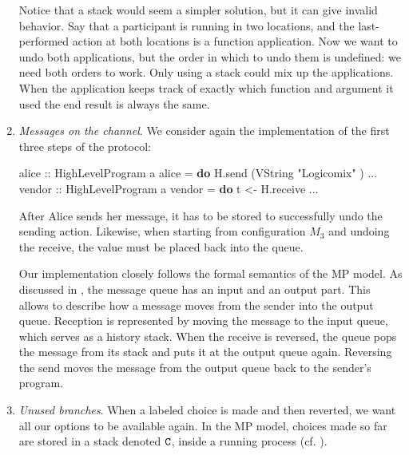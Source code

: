 \documentclass[runningheads,plain]{llncs}
\newcommand{\checkthis}[1]{#1}
\newenvironment{Shaded}{}{}
\newcommand{\KeywordTok}[1]{\textcolor[rgb]{0.00,0.44,0.13}{\textbf{#1}}}
\newcommand{\DataTypeTok}[1]{\textcolor[rgb]{0.56,0.13,0.00}{#1}}
\newcommand{\StringTok}[1]{\textcolor[rgb]{0.25,0.44,0.63}{#1}}
\newcommand{\OtherTok}[1]{\textcolor[rgb]{0.00,0.44,0.13}{#1}}
\newcommand{\FunctionTok}[1]{\textcolor[rgb]{0.02,0.16,0.49}{#1}}
\newcommand{\NormalTok}[1]{#1}
\begin{document}
\begin{enumerate}[1.]
 Notice that a stack would seem a simpler solution, but it
  can give invalid behavior. Say that a participant is running in two
  locations, and the last-performed action at both locations is a
  function application. Now we want to undo both applications, but the
  order in which to undo them is undefined: we need both orders to work.
  Only using a stack could mix up the applications. When the application
  keeps track of exactly which function and argument it used the end
  result is always the same.  \\
  
\item \emph{Messages on the channel}.
    We consider again the implementation of the first three steps of the protocol:

\begin{Shaded}
\begin{Highlighting}[]
\OtherTok{alice ::} \DataTypeTok{HighLevelProgram}\NormalTok{ a}
\NormalTok{alice }\FunctionTok{=} \KeywordTok{do} 
\NormalTok{    H.send (}\DataTypeTok{VString} \StringTok{"Logicomix"}\NormalTok{ )}
    \FunctionTok{...}
\OtherTok{vendor ::} \DataTypeTok{HighLevelProgram}\NormalTok{ a}
\NormalTok{vendor }\FunctionTok{=} \KeywordTok{do} 
\NormalTok{    t }\OtherTok{<-}\NormalTok{ H.receive }
    \FunctionTok{...}
\end{Highlighting}
\end{Shaded}

  After Alice sends her message, it has to be stored to successfully undo the sending action.
  Likewise, when starting from configuration $M_3$ and undoing the receive,
  the value must be placed back into the queue. 

  \checkthis{Our implementation closely follows the formal semantics of the MP model. 
  As discussed in \secref{ss:processes}, the message queue has an input and an output part.
  This  
  allows to describe how a message moves from the sender into the
  output queue. Reception is represented by moving the message  to the input queue, which serves as a
  history stack.  
  {When the receive is reversed}, the queue pops the message
  from its stack and puts it at the output queue again. Reversing
  the send moves the message from the output queue  back to
  the sender's program}. \\
  
\item \emph{Unused branches}.
  When a labeled choice is made and then reverted, we want all our options to be
  available again. In the MP model, choices made so far are stored in a stack denoted $\mathtt{C}$, inside a running process (cf. ). %
  

\end{enumerate}
\end{document}
